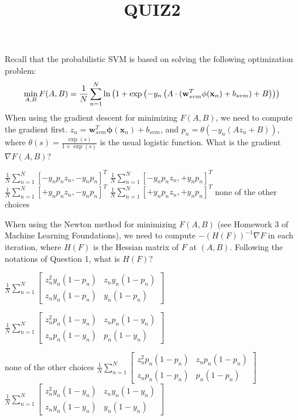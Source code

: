 \documentclass[a4paper,10pt]{exam}
\title{QUIZ2}
\date{}
\author{}
\begin{document}
\maketitle
\begin{questions}
	\question Recall that the probabilistic SVM is based on solving the following optimization problem:
\[\mathop {\min }\limits_{A,B} F(A,B) = \frac{1}{N}\sum\limits_{n = 1}^N {\ln } \left( {1 + \exp \left( { - {y_n}\left( {A \cdot ({\bf{w}}_{svm}^T\phi ({{\bf{x}}_n}) + {b_{svm}}) + B} \right)} \right)} \right)\]
	When using the gradient descent for minimizing $F(A,B)$, we need to compute the gradient first. $z_n = \mathbf{w}_{svm}^T   \mathbf{\phi}(\mathbf{x}_n)+b_{svm}$, and $p_n = \theta(-y_n( A z_n + B))$, where $\theta(s) = \frac{\exp(s)}{1+\exp(s)}$ is the usual logistic function. What is the gradient $\nabla F(A,B)$?
	\begin{choices}
    	\CorrectChoice $\frac{1}{N}\sum_{n=1}^N [-y_np_nz_n, -y_np_n ]^T$
		\choice $\frac{1}{N}\sum_{n=1}^N [ -y_np_nz_n, +y_np_n ]^T$
		\choice $\frac{1}{N}\sum_{n=1}^N [ +y_np_nz_n, -y_np_n ]^T$
		\choice $\frac{1}{N}\sum_{n=1}^N [ +y_np_nz_n, +y_np_n ]^T$
		\choice none of the other choices\\
	\end{choices}
	
	\question When using the Newton method for minimizing $F(A,B)$ (see Homework 3 of Machine Learning Foundations), we need to compute $-(H(F))^{-1    }\nabla F $ in each iteration, where $H(F)$ is the Hessian matrix of $F$ at $(A,B)$. Following the notations of Question 1, what is $H(F)$?
	\begin{choices}
		\choice 	$\frac{1}{N}\sum\limits_{n = 1}^N {\left[ {\begin{array}{*{20}{c}}
				{z_n^2{y_n}(1 - {p_n})}&{{z_n}{y_n}(1 - {p_n})}\\
				{{z_n}{y_n}(1 - {p_n})}&{{y_n}(1 - {p_n})}
				\end{array}} \right]} $
		
		\choice  $\frac{1}{N}\sum\limits_{n = 1}^N {\left[ {\begin{array}{*{20}{c}}
				{z_n^2{p_n}(1 - {y_n})}&{{z_n}{p_n}(1 - {y_n})}\\
				{{z_n}{p_n}(1 - {y_n})}&{{p_n}(1 - {y_n})}
				\end{array}} \right]} $
		
		\choice none of the other choices
		\CorrectChoice $\frac{1}{N}\sum\limits_{n = 1}^N {\left[ {\begin{array}{*{20}{c}}
				{z_n^2{p_n}(1 - {p_n})}&{{z_n}{p_n}(1 - {p_n})}\\
				{{z_n}{p_n}(1 - {p_n})}&{{p_n}(1 - {p_n})}
				\end{array}} \right]} $
		\choice $\frac{1}{N}\sum\limits_{n = 1}^N {\left[ {\begin{array}{*{20}{c}}
				{z_n^2{y_n}(1 - {y_n})}&{{z_n}{y_n}(1 - {y_n})}\\
				{{z_n}{y_n}(1 - {y_n})}&{{y_n}(1 - {y_n})}
				\end{array}} \right]} $\\
	\end{choices}
	

\end{questions}
\end{document}
